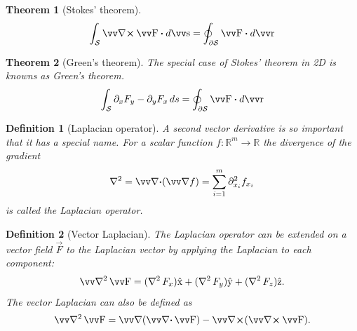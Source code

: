 \documentclass[twocolumn, margin=small]{tex/hsrzf}
\theoremstyle{fuvarzf}
\newtheorem{theorem}{Theorem}
\newtheorem{definition}{Definition}
\begin{document}
\begin{theorem}[Stokes' theorem]
  \[
    \int_\mathcal{S} \curl \vec{F} \dotp d\vec{s}
    = \oint_{\partial\mathcal{S}} \vec{F} \dotp d\vec{r}
  \]
\end{theorem}

\begin{theorem}[Green's theorem]
  The special case of Stokes' theorem in 2D is knowns as Green's theorem.
  \[
    \int_\mathcal{S} \partial_x F_y - \partial_y F_x \,ds
    = \oint_{\partial\mathcal{S}} \vec{F} \dotp d\vec{r}
  \]
\end{theorem}

\begin{definition}[Laplacian operator]
  A second vector derivative is so important that it has a special name.  For a
  scalar function \(f: \mathbb{R}^m \to \mathbb{R}\) the divergence of the
  gradient
  \[
    \laplacian = \div (\grad f) = \sum_{i=1}^m \partial_{x_i}^2 f_{x_i}
  \]
  is called the \emph{Laplacian operator}.
\end{definition}

\begin{definition}[Vector Laplacian]
  The Laplacian operator can be extended on a vector field \(\vec{F}\) to the 
  \emph{Laplacian vector} by applying the Laplacian to each component:
  \[
    \vlaplacian \vec{F} 
      = (\laplacian F_x)\uvec{x} 
      + (\laplacian F_y)\uvec{y} 
      + (\laplacian F_z)\uvec{z} .
  \]
  The vector Laplacian can also be defined as
  \[
    \vlaplacian \vec{F} = \grad (\div \vec{F}) - \curl (\curl \vec{F}).
  \]
\end{definition}
\end{document}
